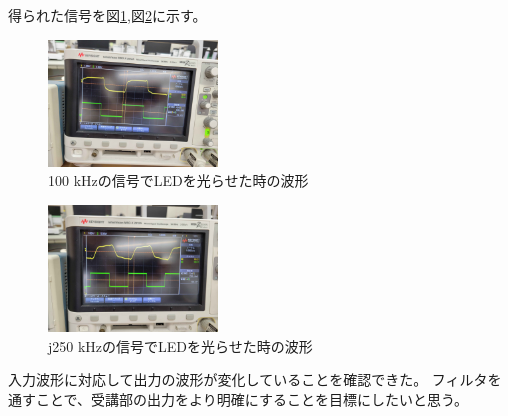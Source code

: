 \documentclass[a4paper,12pt]{article}
\begin{document}
\begin{multicols}{2}
  得られた信号を図\ref{jukou2},図\ref{jukou3}に示す。
  \begin{figure}[H]
    \centering
    \includegraphics[width=0.4\textwidth]{fig/100.jpg}
    \caption{100 kHzの信号でLEDを光らせた時の波形}
    \label{jukou2}
    \end{figure}
    \begin{figure}[H]
      \centering
      \includegraphics[width=0.4\textwidth]{fig/250.jpg}
      \caption{j250 kHzの信号でLEDを光らせた時の波形}
      \label{jukou3}
      \end{figure}
      入力波形に対応して出力の波形が変化していることを確認できた。
      フィルタを通すことで、受講部の出力をより明確にすることを目標にしたいと思う。
\end{multicols}
\end{document}
